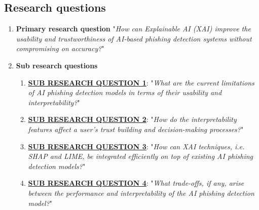 
\subsection{Research questions}

\begin{enumerate}
  \item \textbf{Primary research question}
  "\textit{How can Explainable AI (XAI) improve the usability and trustworthiness of AI-based phishing detection systems without compromising on accuracy?}"
  \item \textbf{Sub research questions}
    \begin{enumerate}
      \item \uline{\textbf{SUB RESEARCH QUESTION 1}}: "\textit{What are the current limitations of AI phishing detection models in terms of their usability and interpretability?}"\label{sub-research-q1}
      \item \uline{\textbf{SUB RESEARCH QUESTION 2}}: "\textit{How do the interpretability features affect a user's trust building and decision-making processes?}"\label{sub-research-q2}
      \item \uline{\textbf{SUB RESEARCH QUESTION 3}}: "\textit{How can XAI techniques, i.e. SHAP and LIME, be integrated efficiently on top of existing AI phishing detection models?}"\label{sub-research-q3}
      \item \uline{\textbf{SUB RESEARCH QUESTION 4}}: "\textit{What trade-offs, if any, arise between the performance and interpretability of the AI phishing detection model?}"\label{sub-research-q4}
    \end{enumerate}
\end{enumerate}
